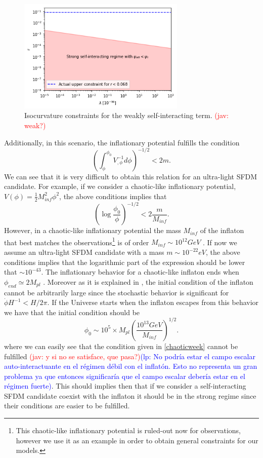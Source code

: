 \documentclass[amssymb,twocolumn,prd,nofootinbib,showpacs]{revtex4-1}
\newcommand{\jav}[1]{\textcolor{red}{(jav: #1)}}
\newcommand{\lp}[1]{\textcolor{blue}{(lp: #1)}}
\begin{document}
\begin{figure}[h!]
\includegraphics[width=8cm]{lambdavsr.png}
\caption{Isocurvature constraints for the weakly self-interacting term. \jav{weak?}}\label{constraintsSFDMl}
\end{figure} 

Additionally, in this scenario, the inflationary potential fulfills the condition 
%
\begin{equation}
\left(\int^{\phi_0}_\phi V_{,\phi}^{-1}d\phi\right)^{-1/2}<2m.
\end{equation}
%
We can see that it is very difficult to obtain this relation for an ultra-light SFDM candidate. 
For example, if we consider a chaotic-like inflationary potential, $V(\phi)=\frac{1}{2}M_{inf}^2\phi^2$, 
the above conditions implies that
%
\begin{equation}\label{chaoticweek}
\left(\log\frac{\phi_0}{\phi}\right)^{-1/2}<2\frac{m}{M_{inf}}.
\end{equation}
%
However, in a chaotic-like inflationary potential the mass $M_{inf}$ of the inflaton 
that best matches the observations\footnote{This chaotic-like inflationary potential is 
ruled-out now for observations, however we use it as an example in order to obtain 
general constraints for our models.} is of order $M_{inf}\sim 10^{12} GeV$ \cite{Liddle}. 
If now we assume an ultra-light SFDM candidate with a mass $m\sim 10^{-22}eV$, 
the above conditions implies that the logarithmic part of the expression should be 
lower that $\sim 10^{-43}$. The inflationary behavior for a chaotic-like inflaton ends 
when $\phi_{end}\simeq 2M_{pl}$ \cite{curvatonatractor,Liddle}. Moreover as it is 
explained in \cite{curvatonatractor}, the initial condition of the inflaton cannot be 
arbitrarily large since the stochastic behavior is significant for $\dot\phi H^{-1}<H/2\pi$. 
%
If the Universe starts when the inflaton escapes from this 
behavior we have that the initial condition should be
%
\begin{equation}\label{phi_0}
\phi_0\sim 10^5\times M_{pl}\left(\frac{10^{13}GeV}{M_{inf}}\right)^{1/2}.
\end{equation}
%
where we can easily see that the condition given in \eqref{chaoticweek} cannot be fulfilled 
\jav{y si no se satisface, que pasa?}\lp{No podr\'ia estar el campo escalar auto-interactuante en
el r\'egimen d\'ebil con el inflat\'on.  Esto no representa un
gran problema ya que entonces significar\'ia que el campo
escalar deber\'ia estar en el r\'egimen fuerte}. This should implies then that if we consider a self-interacting SFDM candidate coexist with the inflaton it should be in the strong regime since their conditions are easier to be fulfilled.
\end{document}
